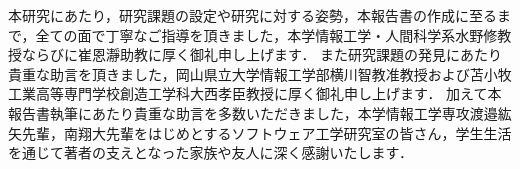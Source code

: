 \documentclass[main]{subfiles}
\begin{document}
\acknowledgement

本研究にあたり，研究課題の設定や研究に対する姿勢，本報告書の作成に至るまで，全ての面で丁寧なご指導を頂きました，本学情報工学・人間科学系水野修教授ならびに崔恩瀞助教に厚く御礼申し上げます．
また研究課題の発見にあたり貴重な助言を頂きました，岡山県立大学情報工学部横川智教准教授および苫小牧工業高等専門学校創造工学科大西孝臣教授に厚く御礼申し上げます．
加えて本報告書執筆にあたり貴重な助言を多数いただきました，本学情報工学専攻渡邉紘矢先輩，南翔大先輩をはじめとするソフトウェア工学研究室の皆さん，学生生活を通じて著者の支えとなった家族や友人に深く感謝いたします．
\end{document}
